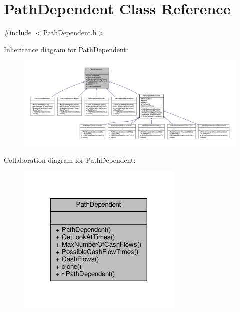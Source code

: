 \hypertarget{classPathDependent}{}\section{Path\+Dependent Class Reference}
\label{classPathDependent}


{\ttfamily \#include $<$Path\+Dependent.\+h$>$}



Inheritance diagram for Path\+Dependent\+:
\nopagebreak
\begin{figure}[H]
\begin{center}
\leavevmode
\includegraphics[width=350pt]{classPathDependent__inherit__graph}
\end{center}
\end{figure}


Collaboration diagram for Path\+Dependent\+:
\nopagebreak
\begin{figure}[H]
\begin{center}
\leavevmode
\includegraphics[width=225pt]{classPathDependent__coll__graph}
\end{center}
\end{figure}
